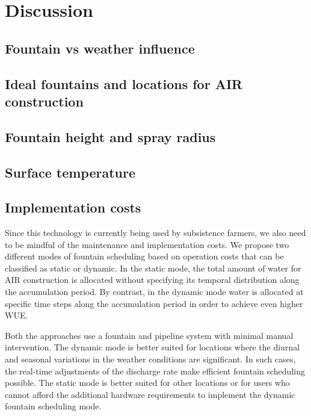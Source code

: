 \documentclass[tc, manuscript]{copernicus}
\begin{document}
\section{Discussion}
\subsection{Fountain vs weather influence}

\subsection{Ideal fountains and locations for AIR construction}

\subsection{Fountain height and spray radius}


\subsection{Surface temperature}

\subsection{Implementation costs}

Since this technology is currently being used by subsistence farmers, we also need to be mindful of the
maintenance and implementation costs. We propose two different modes of fountain scheduling based on operation
costs that can be classified as static or dynamic. In the static mode, the total amount of water
for AIR construction is allocated without specifying its temporal distribution along the accumulation period. By
contrast, in the dynamic mode water is allocated at specific time steps along the accumulation period in
order to achieve even higher WUE.

Both the approaches use a fountain and pipeline system with minimal manual intervention. The dynamic mode is
better suited for locations where the diurnal and seasonal variations in the weather conditions are significant.
In such cases, the real-time adjustments of the discharge rate make efficient fountain scheduling
possible. The static mode is better suited for other locations or for users who cannot afford the additional
hardware requirements to implement the dynamic fountain scheduling mode.
\end{document}
